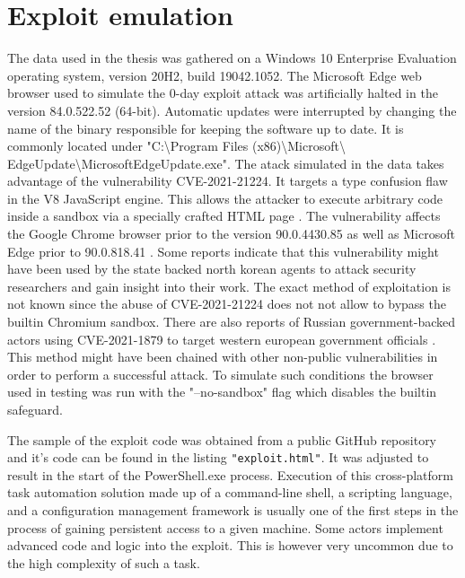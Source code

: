 \documentclass[a4paper,twoside,12pt]{book}
\begin{document}
\section{Exploit emulation}

The data used in the thesis was gathered on a Windows 10 Enterprise Evaluation operating 
system, version 20H2, build 19042.1052. The Microsoft Edge web browser used to simulate 
the 0-day exploit attack was artificially halted in the version 84.0.522.52 (64-bit). 
Automatic updates were interrupted by changing the name of the binary responsible for 
keeping the software up to date. It is commonly located under 
"C:\textbackslash Program Files (x86)\textbackslash Microsoft\textbackslash 
EdgeUpdate\textbackslash MicrosoftEdgeUpdate.exe". 
The atack simulated in the data takes advantage of the vulnerability CVE-2021-21224. It 
targets a type confusion flaw in the V8 JavaScript engine. This allows the attacker to 
execute arbitrary code inside a sandbox via a specially crafted HTML page \cite{bib:CVE21224}. 
The vulnerability affects the Google Chrome browser prior to the version 90.0.4430.85 as 
well as Microsoft Edge prior to 90.0.818.41 \cite{bib:edgeRelease}. Some reports indicate 
that this vulnerability might have been used by the state backed north korean agents to 
attack security researchers and gain insight into their work. The exact method of
exploitation is not known since the abuse of CVE-2021-21224 does not not allow to bypass 
the builtin Chromium sandbox. There are also reports of Russian government-backed actors 
using CVE-2021-1879 to target western european government officials \cite{bib:googleBlog}. 
This method might have been chained with other non-public vulnerabilities in order to 
perform a successful attack. To simulate such conditions the browser used in testing was 
run with the "--no-sandbox" flag which disables the builtin safeguard.

The sample of the exploit code was obtained from a public GitHub repository 
\cite{bib:sampleExploit} and it's code can be found in the listing \lstinline|"exploit.html"|. 
It was adjusted to result in the start of the PowerShell.exe process. Execution of this 
cross-platform task automation solution made up of a command-line shell, a scripting 
language, and a configuration management framework is usually one of the first steps in 
the process of gaining persistent access to a given machine. Some actors implement advanced 
code and logic into the exploit. This is however very uncommon due to the high complexity 
of such a task.
\end{document}
